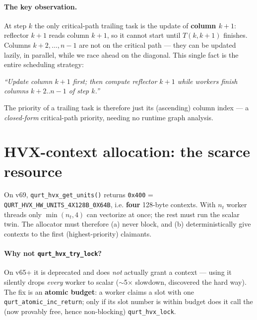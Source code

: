 \documentclass[11pt]{article}
\newcommand{\code}[1]{\texttt{\small #1}}
\begin{document}
\paragraph{The key observation.} At step $k$ the only critical-path trailing task is the
update of \textbf{column $k{+}1$}: reflector $k{+}1$ reads column $k{+}1$, so it cannot
start until $T(k,k{+}1)$ finishes. Columns $k{+}2,\dots,n{-}1$ are not on the critical
path --- they can be updated lazily, in parallel, while we race ahead on the diagonal.
This single fact is the entire scheduling strategy:
\begin{center}\itshape
``Update column $k{+}1$ first; then compute reflector $k{+}1$ while workers finish
columns $k{+}2..n{-}1$ of step $k$.''
\end{center}
The priority of a trailing task is therefore just its (ascending) column index --- a
\emph{closed-form} critical-path priority, needing no runtime graph analysis.

\section{HVX-context allocation: the scarce resource}
\label{sec:alloc}
On v69, \code{qurt\_hvx\_get\_units()} returns \code{0x400} =
\code{QURT\_HVX\_HW\_UNITS\_4X128B\_0X64B}, i.e. \textbf{four} 128-byte contexts. With
$n_t$ worker threads only $\min(n_t,4)$ can vectorize at once; the rest must run the
scalar twin. The allocator must therefore (a) never block, and (b) deterministically
give contexts to the first (highest-priority) claimants.

\paragraph{Why not \code{qurt\_hvx\_try\_lock}?} On v65+ it is deprecated and does
\emph{not} actually grant a context --- using it silently drops \emph{every} worker to
scalar ($\sim$5$\times$ slowdown, discovered the hard way). The fix is an
\textbf{atomic budget}: a worker claims a slot with one \code{qurt\_atomic\_inc\_return};
only if its slot number is within budget does it call the (now provably free, hence
non-blocking) \code{qurt\_hvx\_lock}.
\end{document}
